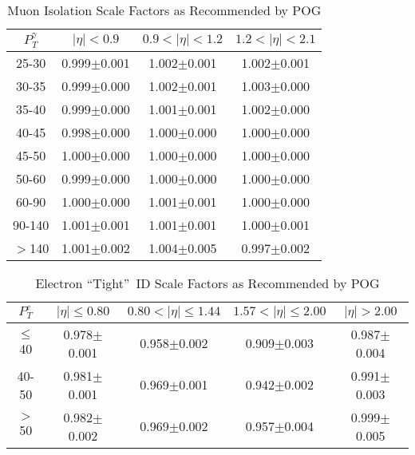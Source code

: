 \begin{table}[h]
  \footnotesize
  \begin{center}
  \caption{Muon Isolation Scale Factors as Recommended by POG} 
   \begin{tabular}{|c|c|c|c|}
 $P_T^{\gamma}$  & $|\eta|< 0.9$   & $0.9<|\eta|< 1.2$    & $1.2<|\eta|< 2.1$ \\ \hline
25-30          & 0.999$\pm$0.001   & 1.002$\pm$0.001    & 1.002$\pm$0.001     \\ \hline
30-35          & 0.999$\pm$0.000   & 1.002$\pm$0.001    & 1.003$\pm$0.000        \\ \hline
35-40          & 0.999$\pm$0.000   & 1.001$\pm$0.001    & 1.002$\pm$0.000        \\ \hline
40-45          & 0.998$\pm$0.000   & 1.000$\pm$0.000    & 1.000$\pm$0.000        \\ \hline
45-50          & 1.000$\pm$0.000   & 1.000$\pm$0.000    & 1.000$\pm$0.000        \\ \hline
50-60          & 0.999$\pm$0.000   & 1.000$\pm$0.000    & 1.000$\pm$0.000        \\ \hline
60-90          & 1.000$\pm$0.000   & 1.001$\pm$0.001    & 1.000$\pm$0.000        \\ \hline
90-140         & 1.001$\pm$0.001   & 1.001$\pm$0.001    & 1.000$\pm$0.001        \\ \hline
$>$140         & 1.001$\pm$0.002   & 1.004$\pm$0.005    & 0.997$\pm$0.002        \\ \hline
  \end{tabular}
  \label{tab:SFs_MuonIso}
  \end{center}
\end{table}

\begin{table}[h]
  \footnotesize
  \begin{center}
  \caption{Electron ``Tight''~ID Scale Factors as Recommended by POG} 
   \begin{tabular}{|c|c|c|c|c|}
 $P_T^{e}$  & $|\eta|\leq 0.80$ & $0.80<|\eta|\leq 1.44$ & $1.57<|\eta|\leq 2.00$ & $|\eta|> 2.00$\\ \hline
$\leq$40       & 0.978$\pm$0.001   & 0.958$\pm$0.002        & 0.909$\pm$0.003        & 0.987$\pm$0.004 \\ \hline
40-50          & 0.981$\pm$0.001   & 0.969$\pm$0.001        & 0.942$\pm$0.002        & 0.991$\pm$0.003 \\ \hline
$>$50            & 0.982$\pm$0.002   & 0.969$\pm$0.002        & 0.957$\pm$0.004        & 0.999$\pm$0.005 \\ \hline
  \end{tabular}
  \label{tab:SFs_ElectronID}
  \end{center}
\end{table}

